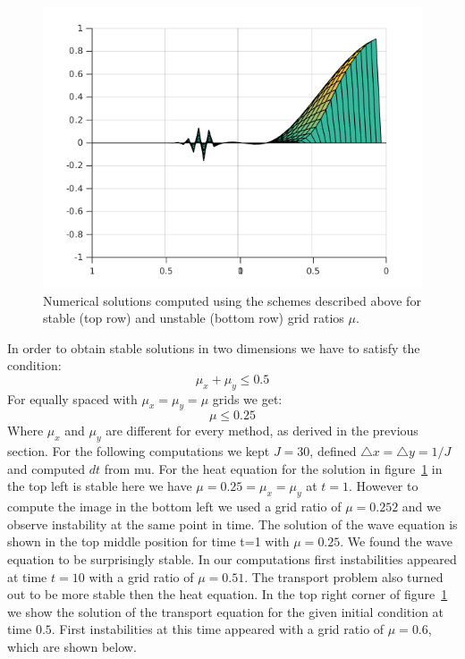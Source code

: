 \begin{figure}
\includegraphics[scale = 0.33]{images/transportUnstable.png}
\caption{Numerical solutions computed using the schemes described above for stable (top row) and unstable (bottom row) grid ratios $\mu$.}
\label{fig:stableUnstable}
\end{figure}
In order to obtain stable solutions in two dimensions we have to satisfy the condition:
\begin{equation}
\mu_x + \mu_y \leq 0.5
\end{equation}
For equally spaced with $\mu_x = \mu_y = \mu$ grids we get:
\begin{equation}
\mu \leq 0.25
\end{equation}
Where $\mu_x$ and $\mu_y$ are different for every method, as derived in the previous section. For the following computations we kept $J=30$, defined $\triangle x = \triangle y = 1/J$ and computed $dt$ from mu. For the heat equation for the solution in figure~\ref{fig:stableUnstable} in the top left is stable here we have $\mu = 0.25 = \mu_x = \mu_y$ at $t=1$. However to compute the image in the bottom left we used a grid ratio of $\mu = 0.252$ and we observe instability at the same point in time. The solution of the wave equation is shown in the top middle position for time t=1 with $\mu = 0.25$. We found the wave equation to be surprisingly stable. In our computations first instabilities appeared at time $t = 10$ with a grid ratio of $\mu = 0.51$. The transport problem also turned out to be more stable then the heat equation. In the top right corner of figure~\ref{fig:stableUnstable} we show the solution of the transport equation for the given initial condition at time $0.5$. First instabilities at this time appeared with a grid ratio of $\mu = 0.6$, which are shown below.



